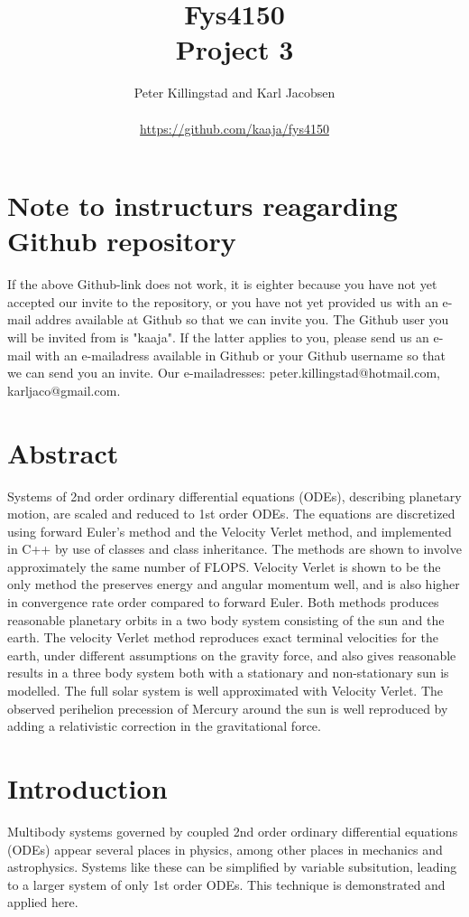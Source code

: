\documentclass{article}
\title{Fys4150\\Project 3\\ }
\author{Peter Killingstad and Karl Jacobsen\\
\\
\url{https://github.com/kaaja/fys4150}}
\begin{document}
	
\maketitle



\section*{Note to instructurs reagarding Github repository}
If the above Github-link does not work, it is eighter because you have not yet accepted our invite to the repository, or you have not yet provided us with an e-mail addres available at Github so that we can invite you. The Github user you will be invited from is "kaaja". If the latter applies to you, please send us an e-mail with an e-mailadress available in Github or your Github username so that we can send you an invite. Our e-mailadresses: peter.killingstad@hotmail.com, karljaco@gmail.com.



\section*{Abstract}
Systems of 2nd order ordinary differential equations (ODEs), describing planetary motion, are scaled and reduced to 1st order ODEs. The equations are discretized using forward Euler's method and the Velocity Verlet method, and implemented in C++ by use of classes and class inheritance. The methods are shown to involve approximately the same number of FLOPS. Velocity Verlet is shown to be the only method the preserves energy and angular momentum well, and is also higher in convergence rate order compared to forward Euler. Both methods produces reasonable planetary orbits in a two body system consisting of the sun and the earth. The velocity Verlet method reproduces exact terminal velocities for the earth, under different assumptions on the gravity force, and also gives reasonable results in a three body system both with a stationary and non-stationary sun is modelled. The full solar system is well approximated with Velocity Verlet. The observed perihelion precession of Mercury around the sun is well reproduced by adding a relativistic correction in the gravitational force.


\section{Introduction}
Multibody systems governed by coupled 2nd order ordinary differential equations (ODEs) appear several places in physics, among other places in mechanics and astrophysics. Systems like these can be simplified by variable subsitution, leading to a larger system of only 1st order ODEs. This technique is demonstrated and applied here.\\
\end{document}
